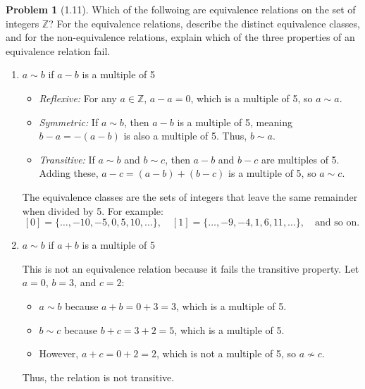 \documentclass[12pt]{article}
\theoremstyle{definition}
\newtheorem{problem}{Problem}
\begin{document}
\begin{problem}[1.11]

    Which of the follwoing are equivalence relations on the set of integers $\mathbb{Z}$?
    For the equivalence relations, describe the distinct equivalence classes, and for the
    non-equivalence relations, explain which of the three properties of an equivalence
    relation fail.

    \begin{enumerate}[label=(\alph*)]
        \item $a \sim b$ if $a - b$ is a multiple of 5
        \begin{solution}
            \begin{itemize}
                \item \textit{Reflexive:} For any \( a \in \mathbb{Z} \), \( a - a = 0 \), which is a multiple of 5, so \( a \sim a \).
                \item \textit{Symmetric:} If \( a \sim b \), then \( a - b \) is a multiple of 5, meaning \( b - a = -(a - b) \) is also a multiple of 5. Thus, \( b \sim a \).
                \item \textit{Transitive:} If \( a \sim b \) and \( b \sim c \), then \( a - b \) and \( b - c \) are multiples of 5. Adding these, \( a - c = (a - b) + (b - c) \) is a multiple of 5, so \( a \sim c \).
            \end{itemize}
            The equivalence classes are the sets of integers that leave the same remainder when divided by 5. For example:
            \[
            [0] = \{ \dots, -10, -5, 0, 5, 10, \dots \}, \quad [1] = \{ \dots, -9, -4, 1, 6, 11, \dots \}, \quad \text{and so on.}
            \]
        \end{solution}

        \item $a \sim b$ if $a + b$ is a multiple of 5

        \begin{solution}
            This is not an equivalence relation because it fails the transitive property. Let \( a = 0 \), \( b = 3 \), and \( c = 2 \):
            \begin{itemize}
                \item \( a \sim b \) because \( a + b = 0 + 3 = 3 \), which is a multiple of 5.
                \item \( b \sim c \) because \( b + c = 3 + 2 = 5 \), which is a multiple of 5.
                \item However, \( a + c = 0 + 2 = 2 \), which is not a multiple of 5, so \( a \not\sim c \).
            \end{itemize}
            Thus, the relation is not transitive.
        \end{solution}


\end{enumerate}
\end{problem}
\end{document}
